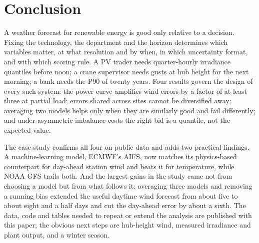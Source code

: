 \section{Conclusion}
\label{sec:conclusion}

A weather forecast for renewable energy is good only relative to a decision. Fixing the technology, the department and the horizon determines which variables matter, at what resolution and by when, in which uncertainty format, and with which scoring rule. A PV trader needs quarter-hourly irradiance quantiles before noon; a crane supervisor needs gusts at hub height for the next morning; a bank needs the P90 of twenty years. Four results govern the design of every such system: the power curve amplifies wind errors by a factor of at least three at partial load; errors shared across sites cannot be diversified away; averaging two models helps only when they are similarly good and fail differently; and under asymmetric imbalance costs the right bid is a quantile, not the expected value.

The case study confirms all four on public data and adds two practical findings. A machine-learning model, ECMWF's AIFS, now matches its physics-based counterpart for day-ahead station wind and beats it for temperature, while NOAA GFS trails both. And the largest gains in the study came not from choosing a model but from what follows it: averaging three models and removing a running bias extended the useful daytime wind forecast from about five to about eight and a half days and cut the day-ahead error by about a sixth. The data, code and tables needed to repeat or extend the analysis are published with this paper; the obvious next steps are hub-height wind, measured irradiance and plant output, and a winter season.
